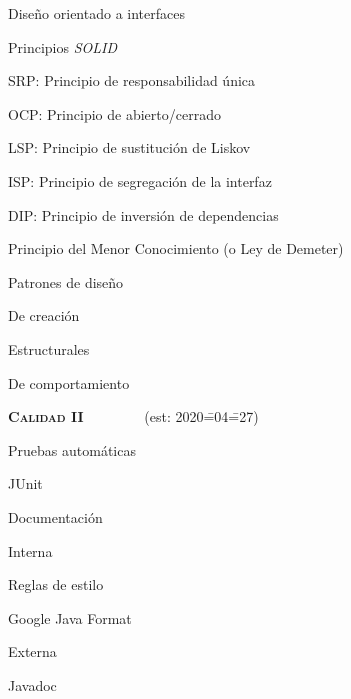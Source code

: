 \begin{longenum}
\begin{longenum}
\begin{longenum}
            \item Diseño orientado a interfaces
            \item Principios \textit{SOLID}
            \begin{longenum}
                \item SRP: Principio de responsabilidad única
                \item OCP: Principio de abierto/cerrado
                \item LSP: Principio de sustitución de Liskov
                \item ISP: Principio de segregación de la interfaz
                \item DIP: Principio de inversión de dependencias
            \end{longenum}
            \item Principio del Menor Conocimiento (o Ley de Demeter)
        \end{longenum}
        \item Patrones de diseño
        \begin{longenum}
            \item De creación
            \item Estructurales
            \item De comportamiento
        \end{longenum}
    \end{longenum}
    \item \textbf{\textsc{Calidad II}} \ \ \ \ \ \ \ \ (est: 2020\==04\==27)
    \begin{longenum}
        \item Pruebas automáticas
        \begin{longenum}
            \item JUnit
        \end{longenum}
        \item Documentación
        \begin{longenum}
            \item Interna
            \begin{longenum}
                \item Reglas de estilo
                \item Google Java Format
            \end{longenum}
            \item Externa
            \begin{longenum}
                \item Javadoc

\end{longenum}
\end{longenum}
\end{longenum}
\end{longenum}
